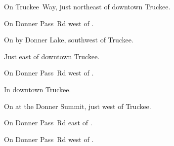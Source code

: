 
\begin{LocationList}

On Truckee~Way, just northeast of downtown Truckee.

On Donner Pass~Rd west of .

On  by Donner Lake, southwest of Truckee.

Just east of downtown Truckee.

On Donner Pass~Rd west of .

In downtown Truckee.

\Location{\RestArea \Rest}
On  at the Donner Summit, just west of Truckee.

On Donner Pass~Rd east of .

\Location{\TruckService \Service}
On Donner Pass~Rd west of .

\end{LocationList}

